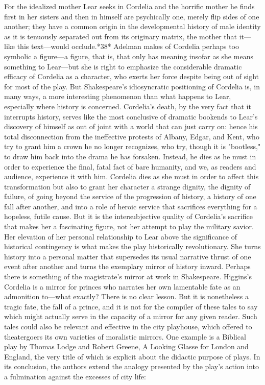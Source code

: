 For the idealized mother Lear seeks in Cordelia and the horrific mother he finds first in her sisters and then in himself are psychically one, merely flip sides of one another; they have a common origin in the developmental history of male identity as it is tenuously separated out from its originary matrix, the mother that it—like this text—would occlude.*38*
Adelman makes of Cordelia perhaps too symbolic a figure—a figure, that is, that only has meaning insofar as she means something to Lear—but she is right to emphasize the considerable dramatic efficacy of Cordelia as a character, who exerts her force despite being out of sight for most of the play. But Shakespeare's idiosyncratic positioning of Cordelia is, in many ways, a more interesting phenomenon than what happens to Lear, especially where history is concerned. Cordelia's death, by the very fact that it interrupts history, serves like the most conclusive of dramatic bookends to Lear's discovery of himself as out of joint with a world that can just carry on: hence his total disconnection from the ineffective protests of Albany, Edgar, and Kent, who try to grant him a crown he no longer recognizes, who try, though it is "bootless," to draw him back into the drama he has forsaken. Instead, he dies as he must in order to experience the final, fatal fact of bare humanity, and we, as readers and audience, experience it with him. Cordelia dies as she must in order to affect this transformation but also to grant her character a strange dignity, the dignity of failure, of going beyond the service of the progression of history, a history of one fall after another, and into a role of heroic service that sacrifices everything for a hopeless, futile cause. But it is the intersubjective quality of Cordelia's sacrifice that makes her a fascinating figure, not her attempt to play the military savior. Her elevation of her personal relationship to Lear above the significance of historical contingency is what makes the play historically revolutionary. She turns history into a personal matter that supersedes its usual narrative thrust of one event after another and turns the exemplary mirror of history inward.
	Perhaps there is something of the magistrate's mirror at work in Shakespeare. Higgins's Cordelia is a mirror for princes who narrates her own lamentable fate as an admonition to—what exactly? There is no clear lesson. But it is nonetheless a tragic fate, the fall of a prince, and it is not for the compiler of these tales to say which might actually serve in the capacity of a mirror for any given reader. Such tales could also be relevant and effective in the city playhouse, which offered to theatergoers its own varieties of moralistic mirrors. One example is a Biblical play by Thomas Lodge and Robert Greene, A Looking Glasse for London and England, the very title of which is explicit about the didactic purpose of plays. In its conclusion, the authors extend the analogy presented by the play's action into a fulmination against the excesses of city life:

